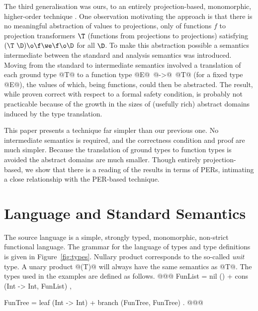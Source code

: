 \documentclass[11pt]{article}
\begin{document}
The third generalisation was ours, to an entirely projection-based,
monomorphic, higher-order technique \cite{Dav93b}.  One observation
motivating the approach is that there is no meaningful abstraction of
values to projections, only of functions $f$ to projection
transformers $\T$ (functions from projections to projections)
satisfying $(\T~\D)\o\f\we\f\o\D$ for all $\D$.  To make this
abstraction possible a semantics intermediate between the standard and
analysis semantics was introduced.  Moving from the standard to
intermediate semantics involved a translation of each ground type @T@
to a function type @E@\ @->@\ @T@ (for a fixed type @E@), the values
of which, being functions, could then be abstracted.  The result,
while proven correct with respect to a formal safety condition, is
probably not practicable because of the growth in the sizes of
(usefully rich) abstract domains induced by the type translation.

This paper presents a technique far simpler than our
previous one.  No intermediate semantics is required, and the
correctness condition and proof are much simpler.  Because the
translation of ground types to function types is avoided the abstract
domains are much smaller. Though entirely projection-based, we show
that there is a reading of the results in terms of PERs, intimating a
close relationship with the PER-based technique.

\section{Language and Standard Semantics}

The source language is a simple, strongly typed, monomorphic,
non-strict functional language.  The grammar for the language of types
and type definitions is given in Figure~\ref{fig:types}.
Nullary product corresponds to the so-called {\it unit\/} type.  A
unary product @(T)@ will always have the same semantics as @T@.  The
types used in the examples are defined as follows.
@@@
     FunList =   nil () 
               + cons (Int -> Int, FunList) , 

     FunTree =   leaf (Int -> Int) 
	       + branch (FunTree, FunTree) .
@@@
\end{document}
